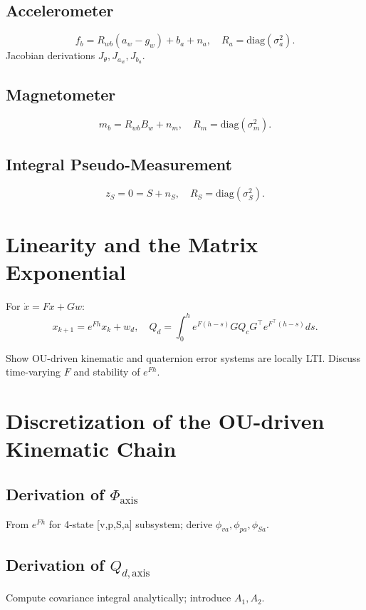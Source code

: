 \documentclass[10pt]{extarticle}
\begin{document}
\subsection{Accelerometer}
\[
f_b = R_{wb}(a_w - g_w) + b_a + n_a,\quad R_a=\mathrm{diag}(\sigma_a^2).
\]
Jacobian derivations $J_\theta, J_{a_w}, J_{b_a}$.

\subsection{Magnetometer}
\[
m_b = R_{wb} B_w + n_m, \quad R_m=\mathrm{diag}(\sigma_m^2).
\]

\subsection{Integral Pseudo-Measurement}
\[
z_S = 0 = S + n_S, \quad R_S=\mathrm{diag}(\sigma_S^2).
\]

\section{Linearity and the Matrix Exponential}
\label{sec:linearity}

For $\dot x = F x + G w$:
\[
x_{k+1} = e^{Fh}x_k + w_d,\quad
Q_d = \int_0^h e^{F(h-s)}GQ_cG^\top e^{F^\top(h-s)}ds.
\]
\cite{jazwinski1970,vanloan1978integrating}

Show OU-driven kinematic and quaternion error systems are locally LTI.
Discuss time-varying $F$ and stability of $e^{Fh}$.

\section{Discretization of the OU-driven Kinematic Chain}
\label{sec:ou_discretization}

\subsection{Derivation of $\Phi_\text{axis}$}
From $e^{Fh}$ for 4-state [v,p,S,a] subsystem; derive $\phi_{va},\phi_{pa},\phi_{Sa}$.

\subsection{Derivation of $Q_{d,\text{axis}}$}
Compute covariance integral analytically; introduce $A_1,A_2$.
\end{document}
